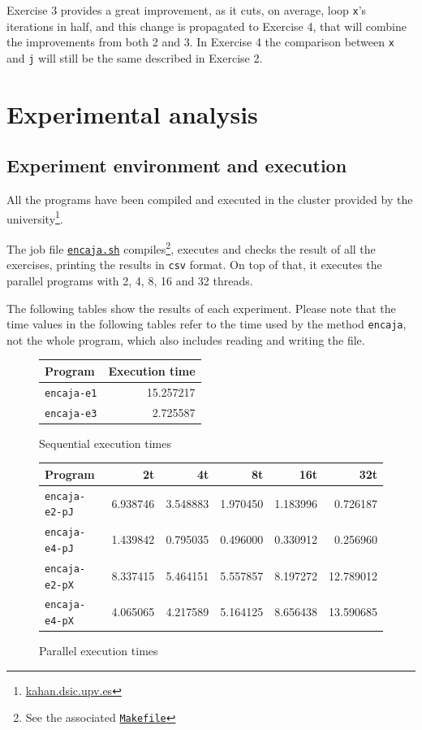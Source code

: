 \documentclass[a4paper]{article}
\newcommand{\github}{https://github.com/kauron/etsinf3/tree/master/CPA/lab2}
\newcommand{\gitname}[1]{\texttt{\href{\github /#1}{#1}}}
\begin{document}
Exercise 3 provides a great improvement, as it cuts, on average, loop \texttt{x}'s iterations in half, and this change is propagated to Exercise 4, that will combine the improvements from both 2 and 3. In Exercise 4 the comparison between \texttt{x} and \texttt{j} will still be the same described in Exercise 2.

\section{Experimental analysis}
\subsection{Experiment environment and execution}
All the programs have been compiled and executed in the cluster provided by the university\footnote{\url{kahan.dsic.upv.es}}.

The job file \gitname{encaja.sh} compiles\footnote{See the associated \gitname{Makefile}}, executes and checks the result of all the exercises, printing the results in \texttt{csv} format. On top of that, it executes the parallel programs with 2, 4, 8, 16 and 32 threads.

The following tables show the results of each experiment. Please note that the time values in the following tables refer to the time used by the method \texttt{encaja}, not the whole program, which also includes reading and writing the file.

\begin{figure}[h]
	\centering
	\begin{tabular}{l r}
		Program            & Execution time \\ \hline
		\texttt{encaja-e1} 	   & 15.257217      \\
		\texttt{encaja-e3}      &  2.725587      \\ \hline
	\end{tabular}
	\caption{Sequential execution times}
	\label{fig:table-time-seq}
\end{figure}
\begin{figure}[h]
	\centering
	\begin{tabular}{l r r r r r}
		Program               & 2t        & 4t        & 8t        & 16t        & 32t        \\ \hline
		\texttt{encaja-e2-pJ} 	  & 6.938746  & 3.548883  & 1.970450  & 1.183996   &  0.726187  \\
		\texttt{encaja-e4-pJ} 	  & 1.439842  & 0.795035  & 0.496000  & 0.330912   &  0.256960  \\
		\texttt{encaja-e2-pX} 	  & 8.337415  & 5.464151  & 5.557857  & 8.197272   & 12.789012  \\
		\texttt{encaja-e4-pX}	  & 4.065065  & 4.217589  & 5.164125  & 8.656438   & 13.590685  \\ \hline
	\end{tabular}
	\caption{Parallel execution times}
	\label{fig:table-time}
\end{figure}
\newpage
\end{document}

